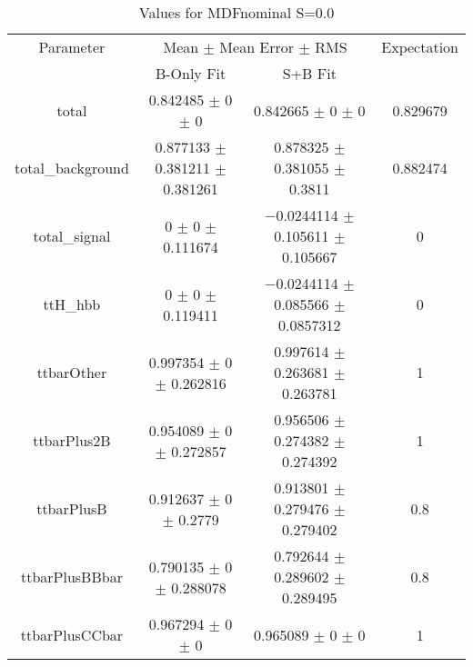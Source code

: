 \begin{table}
\centering
\caption{Values for MDFnominal S=0.0}
\begin{tabular}{cccc}
\toprule
Parameter & \multicolumn{2}{c}{Mean $\pm$ Mean Error $\pm$ RMS} & Expectation\\
 & B-Only Fit & S+B Fit & \\
\midrule
total & \num{0.842485} $\pm$ \num{0} $\pm$ \num{0} & \num{0.842665} $\pm$ \num{0} $\pm$ \num{0} & \num{0.829679}\\
total\_background & \num{0.877133} $\pm$ \num{0.381211} $\pm$ \num{0.381261} & \num{0.878325} $\pm$ \num{0.381055} $\pm$ \num{0.3811} & \num{0.882474}\\
total\_signal & \num{0} $\pm$ \num{0} $\pm$ \num{0.111674} & \num{-0.0244114} $\pm$ \num{0.105611} $\pm$ \num{0.105667} & \num{0}\\
ttH\_hbb & \num{0} $\pm$ \num{0} $\pm$ \num{0.119411} & \num{-0.0244114} $\pm$ \num{0.085566} $\pm$ \num{0.0857312} & \num{0}\\
ttbarOther & \num{0.997354} $\pm$ \num{0} $\pm$ \num{0.262816} & \num{0.997614} $\pm$ \num{0.263681} $\pm$ \num{0.263781} & \num{1}\\
ttbarPlus2B & \num{0.954089} $\pm$ \num{0} $\pm$ \num{0.272857} & \num{0.956506} $\pm$ \num{0.274382} $\pm$ \num{0.274392} & \num{1}\\
ttbarPlusB & \num{0.912637} $\pm$ \num{0} $\pm$ \num{0.2779} & \num{0.913801} $\pm$ \num{0.279476} $\pm$ \num{0.279402} & \num{0.8}\\
ttbarPlusBBbar & \num{0.790135} $\pm$ \num{0} $\pm$ \num{0.288078} & \num{0.792644} $\pm$ \num{0.289602} $\pm$ \num{0.289495} & \num{0.8}\\
ttbarPlusCCbar & \num{0.967294} $\pm$ \num{0} $\pm$ \num{0} & \num{0.965089} $\pm$ \num{0} $\pm$ \num{0} & \num{1}\\
\bottomrule
\end{tabular}
\end{table}